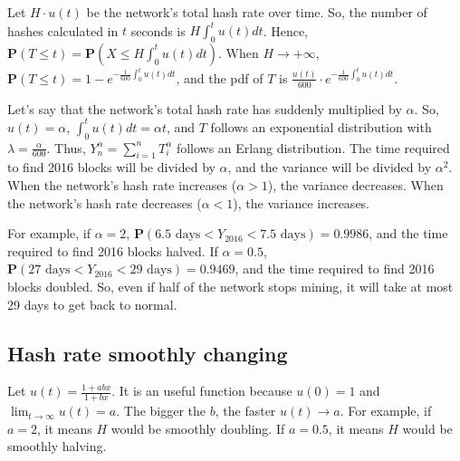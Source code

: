 
Let $H \cdot u(t)$ be the network's total hash rate over time. So, the number of hashes calculated in $t$ seconds is $H \int_0^t u(t) dt$. Hence, $\mathbf{P}(T \leq t) = \mathbf{P}(X \leq H \int_0^t u(t)dt)$. When $H \rightarrow +\infty$, $\mathbf{P}(T \leq t) = 1 - e^{-\frac{1}{600} \int_0^t u(t) dt}$, and the pdf of $T$ is $\frac{u(t)}{600} \cdot e^{-\frac{1}{600} \int_0^t u(t)dt}$.

Let's say that the network's total hash rate has suddenly multiplied by $\alpha$. So, $u(t) = \alpha$, $\int_0^t u(t) dt = \alpha t$, and $T$ follows an exponential distribution with $\lambda = \frac{\alpha}{600}$. Thus, $Y_n^\alpha = \sum_{i=1}^{n} T_i^\alpha$ follows an Erlang distribution. The time required to find 2016 blocks will be divided by $\alpha$, and the variance will be divided by $\alpha^2$. When the network's hash rate increases ($\alpha > 1$), the variance decreases. When the network's hash rate decreases ($\alpha < 1$), the variance increases.

For example, if $\alpha = 2$, $\mathbf{P}(6.5 \text{ days} < Y_{2016} < 7.5 \text{ days}) = 0.9986$, and the time required to find 2016 blocks halved. If $\alpha = 0.5$, $\mathbf{P}(27 \text{ days} < Y_{2016} < 29 \text{ days}) = 0.9469$, and the time required to find 2016 blocks doubled. So, even if half of the network stops mining, it will take at most 29 days to get back to normal.


\subsection{Hash rate smoothly changing}

Let $u(t) = \frac{1+abx}{1+bx}$. It is an useful function because $u(0) = 1$ and $\lim_{t \rightarrow \infty} u(t) = a$. The bigger the $b$, the faster $u(t) \rightarrow a$. For example, if $a=2$, it means $H$ would be smoothly doubling. If $a=0.5$, it means $H$ would be smoothly halving.

